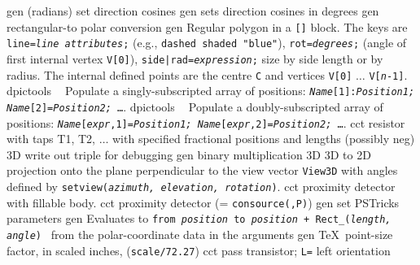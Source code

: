   {gen}%
  {(radians) set direction cosines}%
%
  {gen}%
  {sets direction cosines in degrees }%
%
  {gen}%
  {rectangular-to polar conversion}%
%
  {gen}%
  {Regular polygon in a {\tt []} block. The keys are
    {\tt line={\sl line attributes};} (e.g., {\tt dashed shaded "blue"}),
    {\tt rot={\sl degrees};} (angle of first internal vertex {\tt V[0]}),
    {\tt side|rad={\sl expression};} size by side length or by radius.
   The internal defined points are the centre {\tt C} and vertices
   {\tt V[0]} $\ldots$ {\tt V[{\sl n}-1]}. }%
%
  {dpictools}%
  {$\;\;$  Populate a singly-subscripted array of positions:
    {\tt {\sl Name}[1]:{\sl Position1;}%
         {\sl Name}[2]={\sl Position2;} \ldots}.}%
%
  {dpictools}%
  {$\;\;$  Populate a doubly-subscripted array of positions:
    {\tt {\sl Name}[{\sl expr},1]={\sl Position1;}%
         {\sl Name}[{\sl expr},2]={\sl Position2;} \ldots}.}%
 {cct}%
  {resistor with taps T1, T2, $\ldots$
    with specified fractional positions and lengths (possibly neg)
   }%
%
  {3D} {write out triple for debugging}%
%
  {gen}%
  {binary multiplication}%
%
  {3D}%
  {3D to 2D projection onto the plane perpendicular to the view
  vector {\tt View3D} with angles defined by
  {\tt setview({\sl azimuth, elevation, rotation})}.}%
%
  {cct}%
  {proximity detector with fillable body.}%
%
  {cct}%
  {proximity detector (= {\tt consource(,P)})}%
%
  {gen}%
  {set PSTricks parameters}%
%
  {gen}%
  {Evaluates to {\tt from {\sl position} to
   {\sl position} + Rect\_({\sl length, angle}) }%
   from the polar-coordinate data in the arguments }%
%
  {gen}%
  {\TeX\ point-size factor, in scaled inches, ({\tt *scale/72.27})}%
%
  {cct}%
  {pass transistor; {\tt L=} left orientation
    }%
